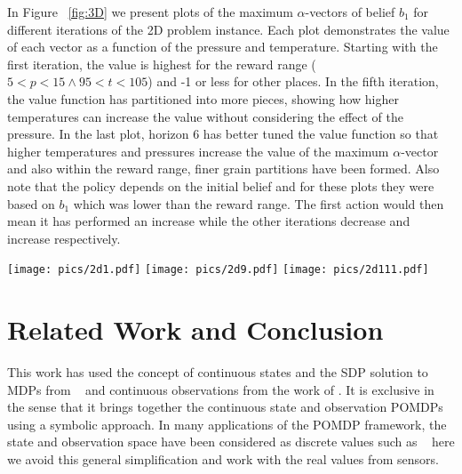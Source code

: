 \documentclass{article} %
\begin{document}
In Figure ~\ref{fig:3D}  we present plots of the maximum $\alpha$-vectors of belief $b_1$ for different iterations of the 2D problem instance. Each plot demonstrates the value of each vector as a function of the pressure and temperature. Starting with the first iteration, the value is highest for the reward range ($5<p<15 \wedge 95<t<105$) and -1 or less for other places. In the fifth iteration, the value function has partitioned into more pieces, showing how higher temperatures can increase the value without considering the effect of the pressure. In the last plot, horizon 6 has better tuned the value function so that higher temperatures and pressures increase the value of the maximum $\alpha$-vector and also within the reward range, finer grain partitions have been formed. Also note that the policy depends on the initial belief and for these plots they were based on $b_1$ which was lower than the reward range. The first action would then mean it has performed an increase while the other iterations decrease and increase respectively.  
\begin{figure*}[tbp!]
\vspace{-2mm}
\centering
\texttt{[image: pics/2d1.pdf]}
\texttt{[image: pics/2d9.pdf]}
\texttt{[image: pics/2d111.pdf]}
\vspace{-3mm}
\caption{\footnotesize 
{\it (left)}Maximum $\alpha$-vector for $b_1$ in first iteration; 
{\it (middle)} $\alpha_{max}^5(b_1)$; 
{\it (right)} $\alpha_{max}^5(b_1)$.%
}
\label{fig:3D}
\vspace{-4mm}
\end{figure*}

\section{Related Work and Conclusion} 
This work has used the concept of continuous states and the SDP solution to MDPs from ~\cite{sanner_uai11} and continuous observations from the work of \cite{pascal_ijcai05}. It is exclusive in the sense that it brings together the continuous state and observation POMDPs using a symbolic approach. 
In many applications of the POMDP framework, the state and observation space have been considered as discrete values such as ~\cite{steam2} here we avoid this general simplification and work with the real values from sensors.
\end{document}
